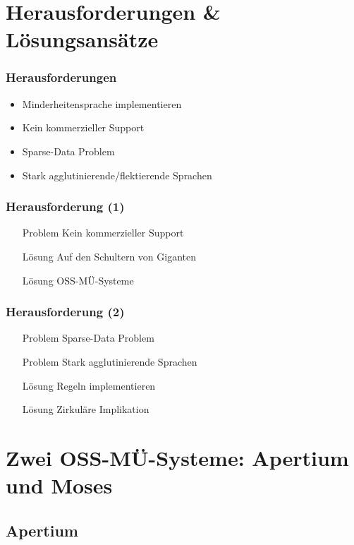 \documentclass{beamer}
\begin{document}
\section{Herausforderungen \& Lösungsansätze}
\begin{frame}
  \frametitle{Herausforderungen}
  \begin{itemize}
    \item Minderheitensprache implementieren
    \item Kein kommerzieller Support
    \item Sparse-Data Problem
    \item Stark agglutinierende/flektierende Sprachen
  \end{itemize}
\end{frame}
\begin{frame}
  \frametitle{Herausforderung (1)}
  \begin{itemize}
    \item[Problem] Kein kommerzieller Support
    \item[Lösung] Auf den Schultern von Giganten
    \item[Lösung] OSS-MÜ-Systeme
  \end{itemize}
\end{frame}
\begin{frame}
  \frametitle{Herausforderung (2)}
  \begin{itemize}
    \item[Problem] Sparse-Data Problem
    \item[Problem] Stark agglutinierende Sprachen
    \item[Lösung] Regeln implementieren
    \item[Lösung] Zirkuläre Implikation \cite{forcada}
  \end{itemize}
\end{frame}
\section{Zwei OSS-MÜ-Systeme: Apertium und Moses}
\subsection{Apertium}
\end{document}
